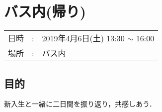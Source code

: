 %

\section{バス内(帰り)}

\begin{tabular}{p{}rp{}}
  日時 & : & 2019年4月6日(土) 13:30 $\sim$ 16:00\\
  場所 & : & バス内
\end{tabular}

\subsection{目的}
新入生と一緒に二日間を振り返り，共感しあう．


